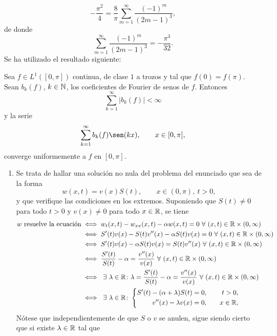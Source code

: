 \documentclass[a4paper, 12pt, extrafontsizes]{memoir}
\begin{document}
\begin{solution}
    \[-\frac{\pi^2}{4} = \frac{8}{\pi}\sum_{m=1}^\infty \frac{(-1)^m}{(2m-1)^3},\]
    de donde 
    \[\sum_{m=1}^\infty \frac{(-1)^m}{(2m-1)^3} = -\frac{\pi^3}{32}.\]
    Se ha utilizado el resultado siguiente:
    \begin{theorem}
        Sea $f\in L^1([0,\pi])$ continua, de clase $1$ a trozos y tal que $f(0)=f(\pi)$. Sean $b_k(f)$, $k \in \mathbb N$, los coeficientes de Fourier de senos de $f$. Entonces
        \[\sum_{k=1}^\infty |b_k(f)| < \infty\]
        y la serie
        \[\sum_{k=1}^\infty b_k(f) \sen(kx), \qquad x \in [0,\pi], \]
        converge uniformemente a $f$ en $[0,\pi]$.
    \end{theorem}
\end{solution}

\begin{solution}
\hfill
\begin{enumerate}
    \item Se trata de hallar una solución no nula del problema del enunciado que sea de la forma
    \[w(x,t) = v(x)S(t), \qquad x \in (0,\pi), \ t > 0,\]
    y que verifique las condiciones en los extremos. Suponiendo que $S(t) \neq 0$ para todo $t > 0$ y $v(x) \neq 0$ para todo $x \in \mathbb R$, se tiene
    \[\begin{aligned}[t]
        w \textup{ resuelve la ecuación} &\iff w_t(x,t)-w_{xx}(x,t) -\alpha w(x,t) = 0 \ \forall \ (x,t) \in \R \times (0,\infty) \\
        &\iff S'(t)v(x)-S(t)v''(x)-\alpha S(t)v(x) = 0 \ \forall \ (x,t) \in \R \times (0,\infty) \\
        &\iff S'(t)v(x)-\alpha S(t)v(x)=S(t)v''(x) \ \forall \ (x,t) \in \R \times (0,\infty) \\
        &\iff \frac{S'(t)}{S(t)}-\alpha=\frac{v''(x)}{v(x)} \ \forall \ (x,t) \in \R \times (0,\infty) \\
        &\iff \ \exists \ \lambda \in \R \colon \lambda = \frac{S'(t)}{S(t)}-\alpha=\frac{v''(x)}{v(x)} \ \forall \ (x,t) \in \R \times (0,\infty)  \\
        &\iff \ \exists \ \lambda \in \R \colon \left\{\begin{alignedat}{3}
            S'(t) -(\alpha+\lambda)S(t) &= 0, \qquad &t > 0, \\
            v''(x) - \lambda v(x) &=0, \qquad &x \in \R,
        \end{alignedat}\right.
    \end{aligned}\]
    Nótese que independientemente de que $S$ o $v$ se anulen, sigue siendo cierto que si existe $\lambda \in \mathbb R$ tal que

\end{enumerate}
\end{solution}
\end{document}
